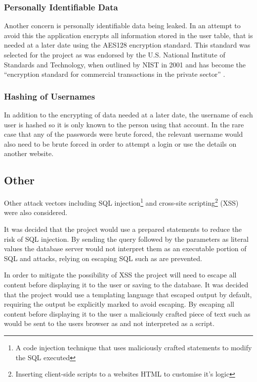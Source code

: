 \subsubsection{Personally Identifiable Data}
Another concern is personally identifiable data being leaked. In an attempt to avoid this the application encrypts all information stored in the user table, that is needed at a later date using the AES128 encryption standard. This standard was selected for the project as was endorsed by the U.S. National Institute of Standards and Technology, when outlined by NIST in 2001 and has become the ``encryption standard for commercial transactions in the private sector'' \cite{nist2010aes, stair2009informationsystems}.

\subsubsection{Hashing of Usernames}
In addition to the encrypting of data needed at a later date, the username of each user is hashed so it is only known to the person using that account. In the rare case that any of the passwords were brute forced, the relevant username would also need to be brute forced in order to attempt a login or use the details on another website.

\subsection{Other} \label{subsection:securityother}
Other attack vectors including SQL injection\footnote{A code injection technique that uses maliciously crafted statements to modify the SQL executed} and cross-site scripting\footnote{Inserting client-side scripts to a websites HTML to customise it's logic} (XSS) were also considered.

It was decided that the project would use a prepared statements to reduce the risk of SQL injection. By sending the query followed by the parameters as literal values the database server would not interpret them as an executable portion of SQL and attacks, relying on escaping SQL such as  are prevented.

In order to mitigate the possibility of XSS the project will need to escape all content before displaying it to the user or saving to the database. It was decided that the project would use a templating language that escaped output by default, requiring the output be explicitly marked to avoid escaping.
%
By escaping all content before displaying it to the user a maliciously crafted piece of text such as  would be sent to the users browser as  and not interpreted as a script.

